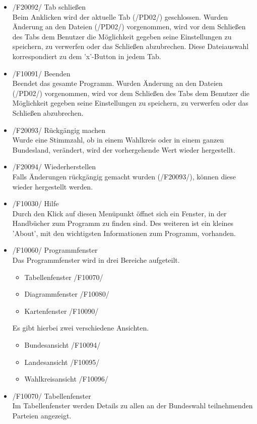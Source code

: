 \documentclass[10pt,a4paper]{article}
\begin{document}
\begin{itemize}
	\item /F20092/ Tab schließen \hfill \\
	Beim Anklicken wird der aktuelle Tab (/PD02/) geschlossen. Wurden Änderung an den Dateien (/PD02/) vorgenommen, wird vor dem Schließen des Tabs dem Benutzer die Möglichkeit gegeben seine Einstellungen zu speichern, zu verwerfen oder das Schließen abzubrechen. Diese Dateiauswahl korrespondiert zu dem 'x'-Button in jedem Tab.
	\item /F10091/ Beenden \hfill \\
	Beendet das gesamte Programm. Wurden Änderung an den Dateien (/PD02/) vorgenommen, wird vor dem Schließen des Tabs dem Benutzer die Möglichkeit gegeben seine Einstellungen zu speichern, zu verwerfen 
	oder das Schließen abzubrechen.
	\item /F20093/ Rückgängig machen \hfill \\
	Wurde eine Stimmzahl, ob in einem Wahlkreis oder in einem ganzen Bundesland, verändert, wird der vorhergehende Wert wieder hergestellt.
	\item /F20094/ Wiederherstellen \hfill \\
	Falls Änderungen rückgängig gemacht wurden (/F20093/), können diese wieder hergestellt werden.
	\item /F10030/ Hilfe \hfill \\
	Durch den Klick auf diesen Menüpunkt öffnet sich ein Fenster, in der Handbücher zum Programm zu finden sind. Des weiteren ist ein kleines 'About', mit den wichtigsten Informationen zum Programm, vorhanden.
	\item /F10060/ Programmfenster \hfill \\
	Das Programmfenster wird in drei Bereiche aufgeteilt.
	\begin{itemize}
		\item Tabellenfenster /F10070/
		\item Diagrammfenster /F10080/
		\item Kartenfenster /F10090/
	\end{itemize}
	Es gibt hierbei zwei verschiedene Ansichten.
	\begin{itemize}
		\item Bundesansicht /F10094/
		\item Landesansicht /F10095/
		\item Wahlkreisansicht /F10096/
	\end{itemize}
	\item /F10070/ Tabellenfenster \hfill \\
	Im Tabellenfenster werden Details zu allen an der Bundeswahl teilnehmenden Parteien angezeigt.

\end{itemize}
\end{document}
